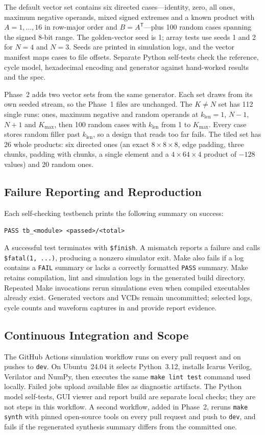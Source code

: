 The default vector set contains six directed cases---identity, zero,
all ones, maximum negative operands, mixed signed extremes and a known
product with $A=1,\ldots,16$ in row-major order and $B=A^{\mathsf T}$---plus
100 random cases spanning the signed 8-bit range. The golden-vector seed
is 1; array tests use seeds 1 and 2 for $N=4$ and $N=3$. Seeds are printed
in simulation logs, and the vector manifest maps cases to file offsets.
Separate Python self-tests check the reference, cycle model, hexadecimal
encoding and generator against hand-worked results and the spec.

Phase~2 adds two vector sets from the same generator. Each set draws from its
own seeded stream, so the Phase~1 files are unchanged. The $K \neq N$ set has
112 single runs: ones, maximum negative and random operands at
$k_{\mathrm{len}} = 1$, $N-1$, $N+1$ and $K_{\max}$, then 100 random cases
with $k_{\mathrm{len}}$ from 1 to $K_{\max}$. Every case stores random filler
past $k_{\mathrm{len}}$, so a design that reads too far fails. The tiled set
has 26 whole products: six directed ones (an exact $8 \times 8 \times 8$,
edge padding, three chunks, padding with chunks, a single element and a
$4 \times 64 \times 4$ product of $-128$ values) and 20 random ones.

\subsection{Failure Reporting and Reproduction}
Each self-checking testbench prints the following summary on success:
\begin{center}
\small\verb|PASS tb_<module> <passed>/<total>|
\end{center}
A successful test terminates with \verb|$finish|. A mismatch reports a
failure and calls
\verb|$fatal(1, ...)|, producing a nonzero simulator exit. Make also fails
if a log contains a \texttt{FAIL} summary or lacks a correctly formatted
\texttt{PASS} summary. Make retains compilation, lint and simulation logs in the
generated build directory. Repeated Make invocations rerun simulations even when
compiled executables already exist. Generated vectors and VCDs remain
uncommitted; selected logs, cycle counts and waveform captures in
 and  provide report evidence.

\subsection{Continuous Integration and Scope}
The GitHub Actions simulation workflow runs on every pull request and on
pushes to \texttt{dev}. On Ubuntu~24.04 it selects Python~3.12, installs
Icarus Verilog, Verilator and NumPy, then executes the same
\texttt{make lint test} command used locally. Failed jobs upload available
 files as diagnostic artifacts. The Python model
self-tests, GUI viewer and report build are separate local checks; they
are not steps in this workflow. A second workflow, added in Phase~2, reruns
\texttt{make synth} with pinned open-source tools on every pull request and
push to \texttt{dev}, and fails if the regenerated synthesis summary differs
from the committed one.

